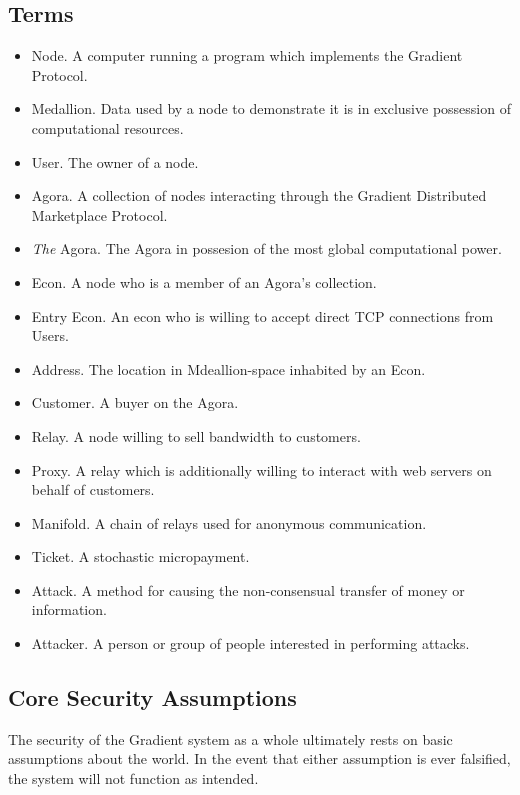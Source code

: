 \documentclass{article}
\begin{document}
\subsection{Terms}

\begin{itemize}
    \item Node. A computer running a program which implements the Gradient Protocol.
    \item Medallion. Data used by a node to demonstrate it is in exclusive possession of computational resources.
    \item User. The owner of a node.
    \item Agora. A collection of nodes interacting through the Gradient Distributed Marketplace Protocol.
    \item \emph{The} Agora. The Agora in possesion of the most global computational power.
    \item Econ. A node who is a member of an Agora's collection.
    \item Entry Econ. An econ who is willing to accept direct TCP connections from Users.
    \item Address. The location in Mdeallion-space inhabited by an Econ.
    \item Customer. A buyer on the Agora.
    \item Relay. A node willing to sell bandwidth to customers.
    \item Proxy. A relay which is additionally willing to interact with web servers on behalf of customers.
    \item Manifold. A chain of relays used for anonymous communication.
    \item Ticket. A stochastic micropayment.
    \item Attack. A method for causing the non-consensual transfer of money or information.
    \item Attacker. A person or group of people interested in performing attacks.
\end{itemize}

\subsection{Core Security Assumptions}
\label{core-security}

The security of the Gradient system as a whole ultimately rests on basic assumptions about the world. In the event that either assumption is ever falsified, the system will not function as intended.
\end{document}

